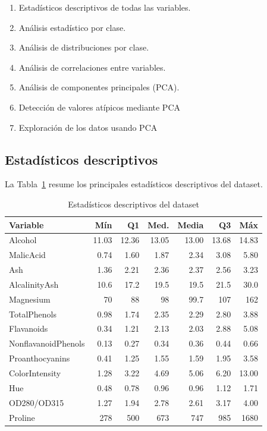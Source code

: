 \begin{enumerate}
    \item Estad\'isticos descriptivos de todas las variables.
    \item An\'alisis estadístico por clase.
    \item Análisis de distribuciones por clase.
    \item An\'alisis de correlaciones entre variables.
    \item An\'alisis de componentes principales (PCA).
    \item Detecci\'on de valores at\'ipicos mediante PCA
    \item Exploración de los datos usando PCA
\end{enumerate}

\subsection{Estad\'isticos descriptivos}

La Tabla~\ref{tab:estadisticos} resume los principales estad\'isticos descriptivos
del dataset.

\begin{table}[H]
    \centering
    \caption{Estad\'isticos descriptivos del dataset}
    \small
    \begin{tabular}{lrrrrrr}
        \toprule
        \textbf{Variable}       & \textbf{M\'in} & \textbf{Q1} & \textbf{Med.}
                                & \textbf{Media} & \textbf{Q3} & \textbf{M\'ax} \\
        \midrule
        Alcohol             & 11.03 & 12.36 & 13.05 & 13.00 & 13.68 & 14.83 \\
        MalicAcid           & 0.74  & 1.60  & 1.87  & 2.34  & 3.08  & 5.80  \\
        Ash                 & 1.36  & 2.21  & 2.36  & 2.37  & 2.56  & 3.23  \\
        AlcalinityAsh       & 10.6  & 17.2  & 19.5  & 19.5  & 21.5  & 30.0  \\
        Magnesium           & 70    & 88    & 98    & 99.7  & 107   & 162   \\
        TotalPhenols        & 0.98  & 1.74  & 2.35  & 2.29  & 2.80  & 3.88  \\
        Flavanoids          & 0.34  & 1.21  & 2.13  & 2.03  & 2.88  & 5.08  \\
        NonflavanoidPhenols & 0.13  & 0.27  & 0.34  & 0.36  & 0.44  & 0.66  \\
        Proanthocyanins     & 0.41  & 1.25  & 1.55  & 1.59  & 1.95  & 3.58  \\
        ColorIntensity      & 1.28  & 3.22  & 4.69  & 5.06  & 6.20  & 13.00 \\
        Hue                 & 0.48  & 0.78  & 0.96  & 0.96  & 1.12  & 1.71  \\
        OD280/OD315         & 1.27  & 1.94  & 2.78  & 2.61  & 3.17  & 4.00  \\
        Proline             & 278   & 500   & 673   & 747   & 985   & 1680  \\
        \bottomrule
    \end{tabular}
    \label{tab:estadisticos}
\end{table}

